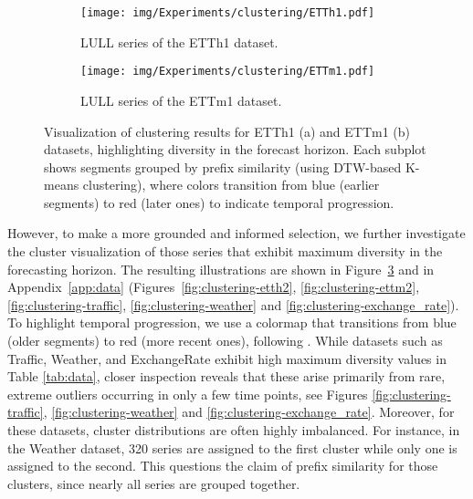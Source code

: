 \documentclass[a4paper,oneside,bibliography=totoc]{scrbook}
\begin{document}
\begin{figure}
    \centering
    \begin{subfigure}[b]{\linewidth}
        \centering
        \texttt{[image: img/Experiments/clustering/ETTh1.pdf]}
        \caption{LULL series of the ETTh1 dataset.}
        \label{fig:clustering-etth1}
    \end{subfigure}

    \vspace{1em}

    \begin{subfigure}[b]{\linewidth}
        \centering
        \texttt{[image: img/Experiments/clustering/ETTm1.pdf]}
        \caption{LULL series of the ETTm1 dataset.}
        \label{fig:clustering-ettm1}
    \end{subfigure}

    \caption{Visualization of clustering results for ETTh1 (a) and ETTm1 (b) datasets, highlighting diversity in the forecast horizon. Each subplot shows segments grouped by prefix similarity (using DTW-based K-means clustering), where colors transition from blue (earlier segments) to red (later ones) to indicate temporal progression.}
    \label{fig:clustering-stacked}
\end{figure}
However, to make a more grounded and informed selection, we further investigate the cluster visualization of those series that exhibit maximum diversity in the forecasting horizon. The resulting illustrations are shown in Figure~\ref{fig:clustering-stacked} and in 
Appendix~\ref{app:data} (Figures~\ref{fig:clustering-etth2}, \ref{fig:clustering-ettm2}, \ref{fig:clustering-traffic}, \ref{fig:clustering-weather} and \ref{fig:clustering-exchange_rate}). 
To highlight temporal progression, we use a colormap that transitions from blue (older segments) to red (more recent ones), following \citet{liu_deep_2024}.
While datasets such as Traffic, Weather, and ExchangeRate exhibit high maximum diversity values in Table \ref{tab:data}, closer inspection reveals that these arise primarily from rare, extreme outliers occurring in only a few time points, see Figures \ref{fig:clustering-traffic}, \ref{fig:clustering-weather} and \ref{fig:clustering-exchange_rate}. 
Moreover, for these datasets, cluster distributions are often highly imbalanced. For instance, in the Weather dataset, 320 series are assigned to the first cluster while only one is assigned to the second.
This questions the claim of prefix similarity for those clusters, since nearly all series are grouped together. %
\end{document}
